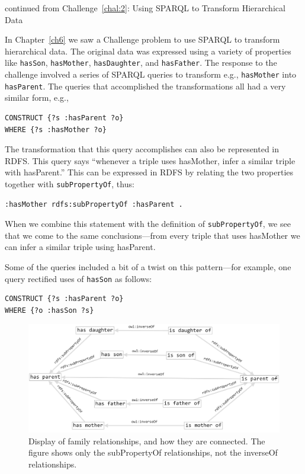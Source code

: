 \begin{challenge}{continued from Challenge~\protect\ref{chal:2}: Using SPARQL to Transform Hierarchical Data}

In Chapter~\ref{ch6} we saw a Challenge problem to use SPARQL to transform
hierarchical data. The original data was expressed using a variety of
properties like \texttt{hasSon}, \texttt{hasMother}, \texttt{hasDaughter}, and \texttt{hasFather}. The
response to the challenge involved a series of SPARQL queries to
transform e.g., \texttt{hasMother} into \texttt{hasParent}. The queries that accomplished
the transformations all had a very similar form, e.g.,

\begin{lstlisting}
CONSTRUCT {?s :hasParent ?o}
WHERE {?s :hasMother ?o}
\end{lstlisting}


The transformation that this query accomplishes can also be represented
in RDFS. This query says ``whenever a triple uses hasMother, infer a
similar triple with hasParent.'' This can be expressed in RDFS by
relating the two properties together with \texttt{subPropertyOf}, thus:

\begin{lstlisting}
:hasMother rdfs:subPropertyOf :hasParent .
\end{lstlisting}

When we combine this statement with the definition of \texttt{subPropertyOf}, we
see that we come to the same conclusions---from every triple that uses
hasMother we can infer a similar triple using hasParent.

Some of the queries included a bit of a twist on this pattern---for
example, one query rectified uses of
\texttt{hasSon} as follows:

\begin{lstlisting}
CONSTRUCT {?s :hasParent ?o}
WHERE {?o :hasSon ?s}
\end{lstlisting}



\begin{figure}
\centering
\includegraphics[width=5in]{SWWOv3/media/ch9/figure9-1.png}
\caption{Display of family relationships, and how they are connected. The figure shows only the
subPropertyOf relationships, not the inverseOf relationships.}
\label{fig:ch9.1}
\end{figure}





\end{challenge}
